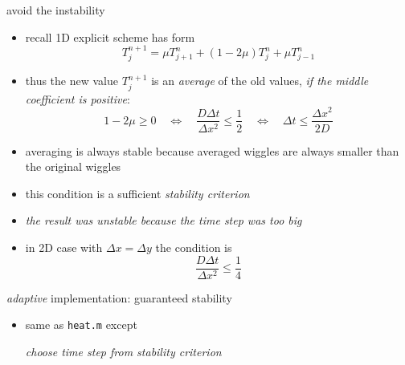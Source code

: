 \begin{frame}{avoid the instability}

\begin{itemize}
\item recall 1D explicit scheme has form 
	$$T_j^{n+1} = \mu T_{j+1}^n + (1 - 2 \mu) T_j^n + \mu T_{j-1}^n$$
\item thus the new value $T_j^{n+1}$ is an \emph{average} of the old values, \emph{if the middle coefficient is positive}:
	$$1 - 2 \mu \ge 0 \quad \iff \quad  \frac{D\Delta t}{\Delta x^2} \le \frac{1}{2} \quad \iff \quad \Delta t \le \frac{\Delta x^2}{2 D}$$
\item averaging is always stable because averaged wiggles are always smaller than the original wiggles
\item this condition is a sufficient \emph{stability criterion}
\item \emph{the result was unstable because the time step was too big}
\item in 2D case with $\Delta x= \Delta y$ the condition is
	$$\frac{D\Delta t}{\Delta x^2} \le \frac{1}{4}$$
\end{itemize}
\end{frame}


\begin{frame}{\textsl{adaptive} implementation: guaranteed stability}

\scriptsize
{}
\normalsize

\begin{itemize}
\item same as \texttt{heat.m} except

\begin{center}
\emph{choose time step from stability criterion}
\end{center}
\end{itemize}\end{frame}


